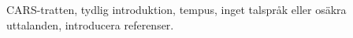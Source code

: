 \documentclass[../rapport_MVEX01-11-05]{subfiles}
\begin{document}
CARS-tratten, tydlig introduktion, tempus, inget talspråk eller osäkra
uttalanden, introducera referenser.
\end{document}
